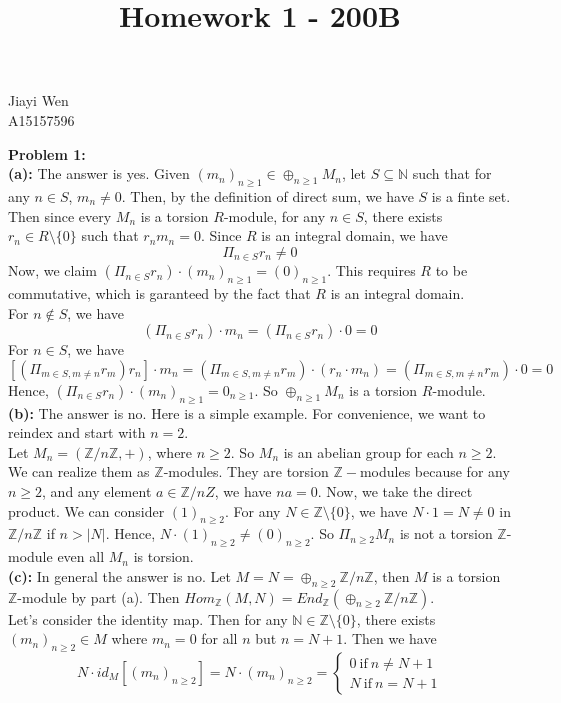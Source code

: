 \documentclass[12pt]{amsart}
\newcommand{\Z}{\mathbb{Z}}
\newcommand{\N}{\mathbb{N}}
\begin{document}
\title{Homework 1 - 200B}
\maketitle
\begin{center}
    Jiayi Wen\\
    A15157596
\end{center}
\textbf{Problem 1:}\\
\textbf{(a):} The answer is yes. Given $(m_n)_{n\geq 1}\in \oplus_{n\geq 1} M_n$, let $S\subseteq \N$ such that for any $n\in S$, $m_n\neq 0$. Then, by the definition of direct sum, we have $S$ is a finte set. Then since every $M_n$ is a torsion $R$-module, for any $n\in S$, there exists $r_n\in R\setminus\{0\}$ such that $r_nm_n=0$. Since $R$ is an integral domain, we have 
\[\Pi_{n\in S}r_n\neq 0\]
Now, we claim $(\Pi_{n\in S}r_n)\cdot (m_n)_{n\geq 1}=(0)_{n\geq 1}$. This requires $R$ to be commutative, which is garanteed by the fact that $R$ is an integral domain.\\
For $n\notin S$, we have 
\[(\Pi_{n\in S}r_n)\cdot m_n=(\Pi_{n\in S}r_n)\cdot 0=0\]
For $n\in S$, we have 
\[[(\Pi_{m\in S, m\neq n}r_m)r_n]\cdot m_n=(\Pi_{m\in S, m\neq n}r_m)\cdot (r_n\cdot m_n)=(\Pi_{m\in S, m\neq n}r_m)\cdot 0=0\]
Hence, $(\Pi_{n\in S}r_n)\cdot (m_n)_{n\geq 1}=0_{n\geq 1}$. So $\oplus_{n\geq 1}M_n$ is a torsion $R$-module.\\
\textbf{(b):} The answer is no. Here is a simple example. For convenience, we want to reindex and start with $n=2$.\\
Let $M_n=(\Z/n\Z,+)$, where $n\geq 2$. So $M_n$ is an abelian group for each $n\geq 2$. We can realize them as $\Z$-modules. They are torsion $\Z-$modules because for any $n\geq 2$, and any element $a\in \Z/nZ$, we have $na=0$. Now, we take the direct product. We can consider $(1)_{n\geq 2}$. For any $N\in \Z\setminus \{0\}$, we have $N\cdot 1=N\neq 0$ in $\Z/n\Z$ if $n>|N|$. Hence, $N\cdot (1)_{n\geq 2}\neq (0)_{n\geq 2}$. So $\Pi_{n\geq 2}M_n$ is not a torsion $\Z$-module even all $M_n$ is torsion.\\
\textbf{(c):} In general the answer is no. Let $M=N=\oplus_{n\geq 2}\Z/n\Z$, then $M$ is a torsion $\Z$-module by part (a). Then $Hom_\Z(M,N)=End_\Z(\oplus_{n\geq 2} \Z/n\Z)$.\\
Let's consider the identity map. Then for any $\N\in \Z\setminus\{0\}$, there exists $(m_n)_{n\geq 2}\in M$ where $m_n=0$ for all $n$ but $n=N+1$. Then we have 
\[N\cdot id_M[(m_n)_{n\geq 2}]=N\cdot (m_n)_{n\geq2}=\begin{cases}
    0 \ \text{if}\  n\neq N+1\\
    N \ \text{if}\  n= N+1
\end{cases}\]
\end{document}
